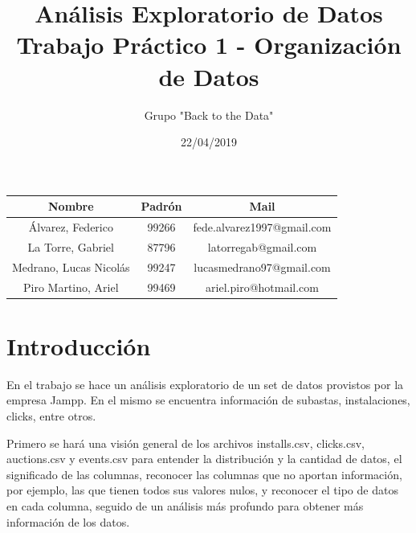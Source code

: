 \documentclass[a4paper, 12pt]{article}
\title{Análisis Exploratorio de Datos \\ Trabajo Práctico 1 - Organización de Datos}
\author{Grupo "Back to the Data"}
\date{22/04/2019}
\begin{document}
\begin{figure}
    \centering
\end{figure}

\maketitle

\FloatBarrier
\begin{center}
        \begin{tabular}{ |c|c|c| }
          \hline
          Nombre & Padrón & Mail \\
          \hline\hline
          Álvarez, Federico & 99266 & fede.alvarez1997@gmail.com \\
          \hline
          La Torre, Gabriel & 87796 & latorregab@gmail.com \\
          \hline
          Medrano, Lucas Nicolás & 99247 & lucasmedrano97@gmail.com \\
          \hline
          Piro Martino, Ariel & 99469 & ariel.piro@hotmail.com \\
          \hline
        \end{tabular}
\end{center}
\FloatBarrier

\newpage

\tableofcontents

\newpage
\section{Introducción}
	 En el trabajo se hace un análisis exploratorio de un set de datos provistos por la empresa Jampp. En el mismo se encuentra información de subastas, instalaciones, clicks, entre otros.
	 
	 Primero se hará una visión general de los archivos installs.csv, clicks.csv, auctions.csv y events.csv para entender la distribución y la cantidad de datos, el significado de las columnas, reconocer las columnas que no aportan información, por ejemplo, las que tienen todos sus valores nulos, y reconocer el tipo de datos en cada columna, seguido de un análisis más profundo para obtener más información de los datos.
	 
\end{document}
